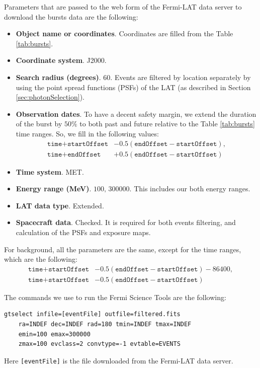 \documentclass[manuscript]{aastex}
\begin{document}
Parameters that are passed to the web form of the Fermi-LAT data server to download the bursts data are the following:
\begin{itemize}
	\item{
		{\bf Object name or coordinates}.
		Coordinates are filled from the Table \ref{tab:bursts}.
	}
	\item{
		{\bf Coordinate system}.
		J2000.
	}
	\item{
		{\bf Search radius (degrees)}.
		$60$.
		Events are filtered by location separately by using the point spread functions (PSFs) of the LAT (as described in Section \ref{sec:photonSelection}).
	}
	\item{
		{\bf Observation dates}.
		To have a decent safety margin, we extend the duration of the burst by $50\%$ to both past and future relative to the Table \ref{tab:bursts} time ranges.
		So, we fill in the following values:
		\begin{align*}
			\texttt{time} + \texttt{startOffset} &- 0.5\left(\texttt{endOffset}-\texttt{startOffset}\right),\\
			\texttt{time} + \texttt{endOffset} &+ 0.5\left(\texttt{endOffset}-\texttt{startOffset}\right)
		\end{align*}
	}
	\item{
		{\bf Time system}.
		MET.
	}
	\item{
		{\bf Energy range (MeV)}.
		$100,\,300000$.
		This includes our both energy ranges.
	}
	\item{
		{\bf LAT data type}.
		Extended.
	}
	\item{
		{\bf Spacecraft data}.
		Checked.
		It is required for both events filtering, and calculation of the PSFs and exposure maps.
	}
\end{itemize}

For background, all the parameters are the same, except for the time ranges, which are the following:
\begin{align*}
	\texttt{time} + \texttt{startOffset} &- 0.5\left(\texttt{endOffset} - \texttt{startOffset}\right) - 86400,\\
	\texttt{time} + \texttt{startOffset} &- 0.5\left(\texttt{endOffset} - \texttt{startOffset}\right)
\end{align*}

The commands we use to run the Fermi Science Tools are the following:
\begin{lstlisting}
gtselect infile=[eventFile] outfile=filtered.fits
	ra=INDEF dec=INDEF rad=180 tmin=INDEF tmax=INDEF
	emin=100 emax=300000
	zmax=100 evclass=2 convtype=-1 evtable=EVENTS
\end{lstlisting}
Here \texttt{[eventFile]} is the file downloaded from the Fermi-LAT data server.
\end{document}
